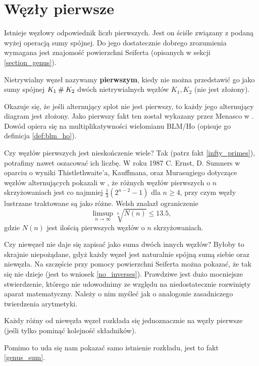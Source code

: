 \section{Węzły pierwsze}
\label{sec:prime_knots}
Istnieje węzłowy odpowiednik liczb pierwszych.
Jest on ściśle związany z podaną wyżej operacją sumy spójnej.
Do jego dostatecznie dobrego zrozumienia wymagana jest znajomość powierzchni Seiferta (opisanych w sekcji \ref{section_genus}).

\begin{definition} \label{primeknot}
    Nietrywialny węzeł nazywamy \textbf{pierwszym},
    kiedy nie można przedstawić go jako sumy spójnej $K_1 \mathbin{\#} K_2$
    dwóch nietrywialnych węzłów $K_1, K_2$ (nie jest złożony).
\end{definition}

Okazuje się, że jeśli alternujący  splot nie jest pierwszy,
to każdy jego alternujący diagram jest złożony.
Jako pierwszy fakt ten został wykazany przez Menasco w \cite{menasco84}.
Dowód opiera się na multiplikatywności wielomianu BLM/Ho (opisuje go definicja \ref{def:blm_ho}).


Czy węzłów pierwszych jest nieskończenie wiele?
Tak (patrz fakt \ref{infty_primes}), potrafimy nawet oszacować ich liczbę.
W roku 1987 C. Ernst, D. Sumners w oparciu o wyniki Thistlethwaite'a, Kauffmana, oraz Murasugiego dotyczące węzłów alternujących pokazali w \cite{ernst87},
że różnych węzłów pierwszych o $n$ skrzyżowaniach jest co najmniej $\frac 1 3 (2^{n- 2} - 1)$ dla $n \ge 4$,
przy czym węzły lustrzane traktowane są jako różne.
Welsh znalazł ograniczenie
\[
    \limsup_{n \to \infty} \sqrt[n]{N(n)} \le 13.5,
\]
gdzie $N(n)$ jest ilością pierwszych węzłów o $n$ skrzyżowaniach.

Czy niewęzeł nie daje się zapisać jako suma dwóch innych węzłów?
Byłoby to skrajnie niepożądane, gdyż każdy węzeł jest naturalnie spójną sumą siebie oraz niewęzła.
Na szczęście przy pomocy powierzchni Seiferta można pokazać, że tak się nie dzieje (jest to wniosek \ref{no_inverses}).
Prawdziwe jest dużo mocniejsze stwierdzenie,
którego nie udowodnimy ze względu na niedostatecznie rozwinięty aparat matematyczny.
Należy o nim myśleć jak o analogonie zasadniczego twierdzenia arytmetyki.

\begin{theorem}[Schubert, 1949]
    Każdy różny od niewęzła węzeł rozkłada się jednoznacznie na węzły pierwsze
    (jeśli tylko pominąć kolejność składników).
\end{theorem}

Pomimo to uda się nam pokazać samo istnienie rozkładu, jest to fakt \ref{genus_sum}.
